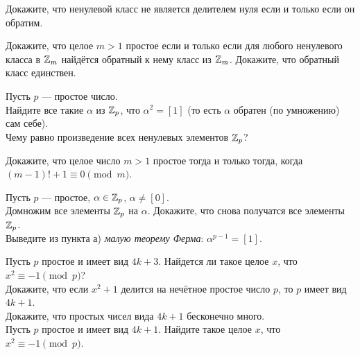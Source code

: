 \documentclass[a4paper, 12pt]{article}
\begin{document}
Докажите, что ненулевой класс не является делителем нуля если и только если он обратим.

  Докажите, что целое $m > 1$ простое если и только если
для любого ненулевого класса в $\mathbb{Z}_m$ найдётся обратный к нему класс из $\mathbb{Z}_m$.
 Докажите, что обратный класс единствен.





Пусть $p$ --- простое число.\\
 Найдите все такие $\alpha$ из $\mathbb{Z}_p$, что $\alpha^2=[1]$
(то есть $\alpha$ обратен (по умножению) сам себе).\\
 Чему равно произведение всех ненулевых элементов $\mathbb{Z}_p$?

Докажите, что целое число $m>1 $ простое тогда и только тогда, когда $(m-1)!+1\equiv0\!\pmod{m}$.

Пусть $p$ --- простое, $\alpha\in\mathbb{Z}_p$, $\alpha\ne[0]$.\\
Домножим все элементы $\mathbb{Z}_p$ на $\alpha$. Докажите, что снова получатся
все элементы $\mathbb{Z}_p$.\\
Выведите из пункта а) {\it малую теорему Ферма}: $\alpha^{p-1}=[1]$.




Пусть $p$ простое и имеет вид $4k+3$. Найдется ли такое целое $x$, что $x^2\equiv-1\!\pmod{p}$?\\
Докажите, что если $x^2+1$ делится на неч\"етное простое число $p$,
то $p$ имеет вид $4k+1$.\\
Докажите, что простых чисел вида $4k+1$ бесконечно много.\\
Пусть $p$ простое и имеет вид $4k+1$. Найдите такое целое $x$, что $x^2\equiv-1\!\pmod{p}$.
\end{document}
